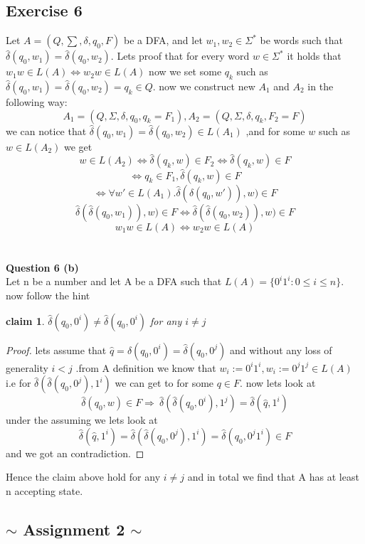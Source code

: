 \documentclass[12pt]{article}
\newtheorem{claim}[theorem]{claim}
\begin{document}
\subsection{Exercise 6}
Let  $A=(Q,\sum,\delta,q_0,F)$ be a DFA, and let $w_1,w_2 \in \Sigma^*$ be words such that $\hat{\delta}(q_0, w_1) = \hat{\delta}(q_0, w_2).$
Lets proof that for every word $ w \in \Sigma^*$
it holds that $w_1w \in L(A) \Leftrightarrow w_2w \in L(A) $ 
now we set some $q_k$ such as \\$\hat{\delta}(q_0, w_1) = \hat{\delta}(q_0, w_2)=q_k \in Q$. now we construct new $A_1$ and $A_2$ in the following way:
\[ A_1=(Q,\Sigma ,\delta,q_0,q_k=F_1),
A_2=(Q,\Sigma ,\delta,q_k,F_2=F)
\]
we can notice that  $\hat{\delta}(q_0, w_1) = \hat{\delta}(q_0, w_2) \in L(A_1)$ ,and for some $w$ such as $w \in L(A_2)$ we get 
\[
w \in L(A_2) \Leftrightarrow  \hat{\delta}(q_k, w) \in F_2
 \Leftrightarrow  \hat{\delta}(q_k, w) \in F
 \]
 \[
  \Leftrightarrow  q_k \in F_1, \hat{\delta}(q_k, w)\in F  
  \]
 \[
  \Leftrightarrow \forall w'\in L(A_1).\hat{\delta} (\hat{\delta}(q_0,w')),w)\in F
   \]
 \[
    \hat{\delta} (\hat{\delta}(q_0,w_1)),w)\in F 
   \Leftrightarrow \hat{\delta} (\hat{\delta}(q_0,w_2)),w)\in F 
\]
 \[
   w_1w\in L(A)
   \Leftrightarrow    w_2w\in L(A)
\]
\\\\
\textbf{Question 6 (b)}\\
Let n be a number and let A be a DFA such that $L(A) = \lbrace0^
i1^
i
: 0 \leq
i \leq n\rbrace.
$
now follow the hint
\begin{claim}
$\hat{\delta}(q_0,0^i) \neq \hat{\delta}(q_0,0^i) $
for any $i\neq j$
\end{claim}
\begin{proof}
lets assume that $\hat{q}=\hat{\delta}(q_0,0^i) = \hat{\delta}(q_0,0^j) $ and without any loss of generality $i<j$ .from  A definition we know that $w_i:= 0^i1^i ,w_i:= 0^j1^j \in L(A)$ i.e for $\hat{\delta}(\hat{\delta}(q_0,0^j),1^i )$ we can get to for some $q\in F$. now lets look at 
 \[\hat{\delta}(q_0,w)\in F \Rightarrow\  \hat{\delta}(\hat{\delta}(q_0,0^i),1^j )=\hat{\delta}(\hat{q},1^i )
\]
under the assuming we lets look at 
\[\hat{\delta}(\hat{q},1^i )=\hat{\delta}(\hat{\delta}(q_0,0^j),1^i )=\hat{\delta}(q_0,0^j1^i)\in F
\]
and we got an contradiction.

\end{proof}
Hence the claim above hold for any $i\neq j$ and in total we find that A  has at least n accepting state.
\pagebreak
\begin{center}
\section{$\sim$ Assignment 2 $\sim$}
\end{center}
\end{document}
